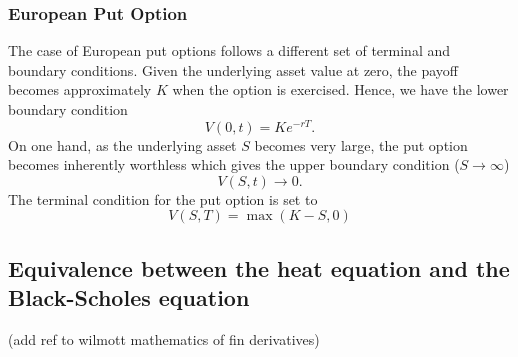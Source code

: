 \subsubsection{European Put Option}
The case of European put options follows a different set of terminal and boundary conditions. Given the underlying asset
value at zero, the payoff becomes approximately $K$ when the option is exercised. Hence, we have
the lower boundary condition
\begin{equation}
    V(0,t) = Ke^{-rT}.
\end{equation}
On one hand, as the underlying asset $S$ becomes very large, the put option becomes inherently worthless which gives 
the upper boundary condition ($S \to \infty$)
\begin{equation}
    V(S,t) \to 0. 
\end{equation}
The terminal condition for the put option is set to
\begin{equation}
    V(S,T) = \max(K-S,0)
\end{equation}

\subsection{Equivalence between the heat equation and the Black-Scholes equation}\label{sec:equivalence} 
 (add ref to wilmott mathematics of fin derivatives)

